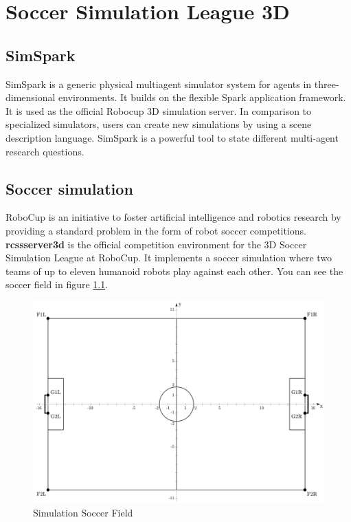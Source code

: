 \chapter{Soccer Simulation League 3D}
\label{Soccer Simulation League 3D}

\section{SimSpark}
SimSpark is a generic physical multiagent simulator system for agents in three-dimensional environments. It builds on the flexible Spark application framework.
It is used as the official Robocup 3D simulation server. In comparison to specialized simulators, users can create new simulations by using a scene description language. SimSpark is a powerful tool to state different multi-agent research questions.
\section{Soccer simulation}
RoboCup is an initiative to foster artificial intelligence and robotics research by providing a standard problem in the form of robot soccer competitions. { \bf rcssserver3d} is the official competition environment for the 3D Soccer Simulation League at RoboCup. It implements a soccer simulation where two teams of up to eleven humanoid robots play against each other. You can see the soccer field in figure \ref{fig:SimulationSoccerField}.
\begin{figure}[ht!]
\centering
  \includegraphics[scale=1.2]{Chapter2/figures/1280px-SoccerSimulation_FieldPlan.png}
  \caption{Simulation Soccer Field} 
  \label{fig:SimulationSoccerField}
\end{figure}
